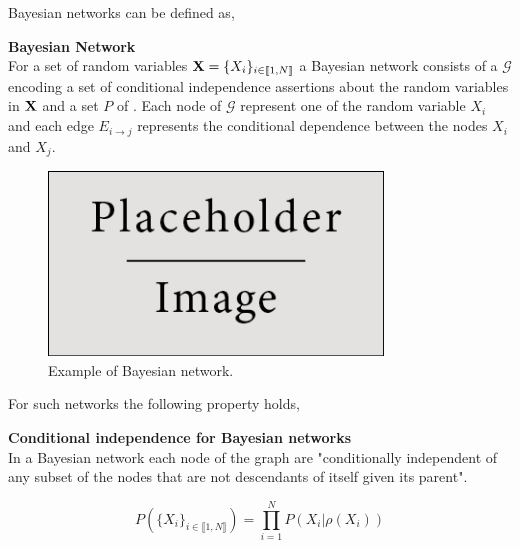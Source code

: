 \documentclass[a4paper,11pt]{report}
\begin{document}
{      Bayesian networks can be defined as,
      
      \begin{defn} \textbf{Bayesian Network}\\
				For a set of random variables ${\bf X} = \{X_{i}\}_{i \in \llbracket1,N \rrbracket}$ a Bayesian network consists of a  $\mathcal{G}$ encoding a set of conditional independence assertions about the random variables in ${\bf X}$ and  a set $P$ of . Each node of $\mathcal{G}$ represent one of the random variable $X_{i}$ and each edge $E_{i \rightarrow j}$ represents the conditional dependence between the nodes $X_{i}$ and $X_{j}$.
				\label{def:BN}
      \end{defn}
     
			\begin{figure}
				\begin{center}
					\includegraphics[width=3.5in]{placeholder.jpg}
					\caption{Example of Bayesian network.} %
					\label{fig:Eg BN}
				\end{center}
			\end{figure}

			For such networks the following property holds,
			
			\begin{prop} \textbf{Conditional independence for Bayesian networks}\\ %
				In a Bayesian network each node of the graph are "conditionally independent of any subset of the nodes that are not descendants of itself given its parent".
				
				\begin{equation}
				  P(\{X_{i}\}_{i \in \llbracket1,N \rrbracket}) = \prod_{i=1}^{N} P(X_{i} | \rho(X_{i}))
				  \label{eq:BN CI}
				\end{equation}
				

\end{prop}}
\end{document}
